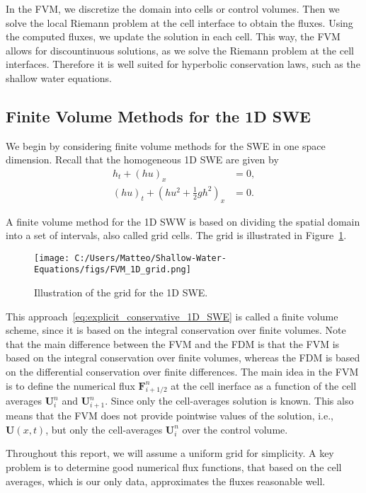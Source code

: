 In the FVM, we discretize the domain into cells or control volumes.
Then we solve the local Riemann problem at the cell interface to obtain the fluxes.
Using the computed fluxes, we update the solution in each cell.
This way, the FVM allows for discountinuous solutions, as we solve the Riemann problem at the cell interfaces.
Therefore it is well suited for hyperbolic conservation laws, such as the shallow water equations.


\subsection{Finite Volume Methods for the 1D SWE}
We begin by considering finite volume methods for the SWE in one space dimension.
Recall that the homogeneous 1D SWE are given by
\begin{align*}
    h_t + {(hu)}_x &= 0, \\
    {(hu)}_t + {\left(hu^2 + \frac{1}{2}gh^2\right)}_x &= 0.
\end{align*}

A finite volume method for the 1D SWW is based on dividing the spatial domain into a set of intervals, also called grid cells.
The grid is illustrated in Figure~\ref{fig:FVM_1D_grid}.
\begin{figure}[H]
    \centering
    \texttt{[image: C:/Users/Matteo/Shallow-Water-Equations/figs/FVM\_1D\_grid.png]}
    \caption{Illustration of the grid for the 1D SWE.}\label{fig:FVM_1D_grid}
\end{figure}



This approach~\eqref{eq:explicit_conservative_1D_SWE} is called a finite volume scheme, since it is based on the integral conservation over finite volumes.
Note that the main difference between the FVM and the FDM is that the FVM is based on the integral conservation over finite volumes, whereas the FDM is based on the differential conservation over finite differences.
The main idea in the FVM is to define the numerical flux $\mathbf{F}_{i+1/2}^n$ at the cell inerface as a function of the cell averages $\mathbf{U}_i^n$ and $\mathbf{U}_{i+1}^n$.
Since only the cell-averages solution is known.
This also means that the FVM does not provide pointwise values of the solution, i.e., $\mathbf{U}(x,t)$, but only the cell-averages $\mathbf{U}_i^n$ over the control volume.

Throughout this report, we will assume a uniform grid for simplicity.
A key problem is to determine good numerical flux functions, that based on the cell averages, which is our only data, approximates the fluxes reasonable well. 



